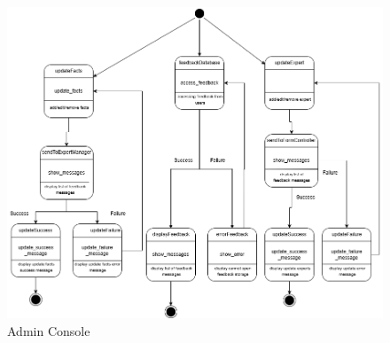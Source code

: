 \begin{figure}[H]
	\centering
	\includegraphics[width=\textwidth, height=\textheight, keepaspectratio]{Section2/images/Admin_Console_state_diagramV2.png}
	\caption{Admin Console}
	\label{AdminConsole}
\end{figure}